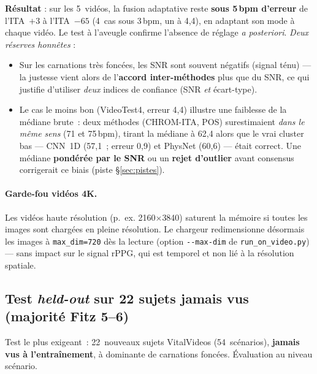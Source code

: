 \documentclass[11pt,a4paper]{article}
\begin{document}
\noindent\textbf{Résultat} : sur les 5~vidéos, la fusion adaptative reste
\textbf{sous 5\,bpm d'erreur} de l'ITA~$+3$ à l'ITA~$-65$ (4~cas sous 3\,bpm, un à
4,4), en adaptant son mode à chaque vidéo. Le test à l'aveugle confirme l'absence de
réglage \emph{a posteriori}. \emph{Deux réserves honnêtes} :
\begin{itemize}[leftmargin=1.4em]
\item Sur les carnations très foncées, les SNR sont souvent négatifs (signal ténu)
--- la justesse vient alors de l'\textbf{accord inter-méthodes} plus que du SNR, ce
qui justifie d'utiliser \emph{deux} indices de confiance (SNR \emph{et} écart-type).
\item Le cas le moins bon (VideoTest4, erreur 4,4) illustre une faiblesse de la
médiane brute~: deux méthodes (CHROM-ITA, POS) surestimaient \emph{dans le même
sens} (71 et 75\,bpm), tirant la médiane à 62,4 alors que le vrai cluster bas
--- CNN~1D (57,1~; erreur 0,9) et PhysNet (60,6) --- était correct. Une médiane
\textbf{pondérée par le SNR} ou un \textbf{rejet d'outlier} avant consensus
corrigerait ce biais (piste §\ref{sec:pistes}).
\end{itemize}

\paragraph{Garde-fou vidéos 4K.} Les vidéos haute résolution (p.~ex. 2160$\times$3840)
saturent la mémoire si toutes les images sont chargées en pleine résolution. Le
chargeur redimensionne désormais les images à \texttt{max\_dim=720} dès la lecture
(option \texttt{-{}-max-dim} de \texttt{run\_on\_video.py}) --- sans impact sur le
signal rPPG, qui est temporel et non lié à la résolution spatiale.

\subsection{Test \emph{held-out} sur 22 sujets jamais vus (majorité Fitz 5--6)}
\label{sec:heldout}

Test le plus exigeant~: 22~nouveaux sujets VitalVideos (54~scénarios),
\textbf{jamais vus à l'entraînement}, à dominante de carnations foncées. Évaluation
au niveau scénario.
\end{document}
